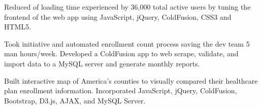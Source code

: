 \begin{cventries}
{\begin{cvitems}
        \item {Reduced  of loading time experienced by 36,000 total active users by tuning the frontend of the web app using JavaScript, jQuery, ColdFusion, CSS3 and HTML5.}
        \item {Took initiative and automated enrollment count process saving the dev team 5 man hours/week. Developed a ColdFusion app to web scrape, validate, and import data to a MySQL server and generate monthly reports.}
        \item {Built interactive map of America's counties to visually compared their healthcare plan enrollment information. Incorporated JavaScript, jQuery, ColdFusion, Bootstrap, D3.js, AJAX, and MySQL Server.}
      \end{cvitems}
    }


\end{cventries}
